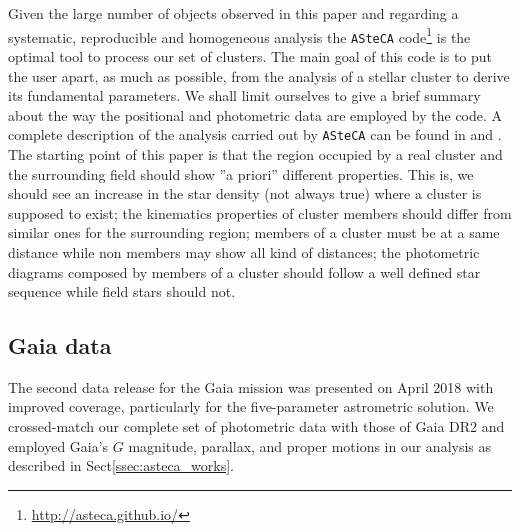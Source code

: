 \documentclass[draft]{aa}
\begin{document}
Given the large number of objects observed in this paper and regarding a
systematic, reproducible and homogeneous analysis the \texttt{ASteCA}
code\footnote{\url{http://asteca.github.io/}} is the optimal tool
to process our set of clusters. The main goal of this code is to put the user
apart, as much as possible, from the analysis of a stellar cluster to derive
its fundamental parameters. We shall limit ourselves to give a brief summary
about the way the positional and photometric data are employed by the code.
A complete description of the analysis carried out by
\texttt{ASteCA} can be found in \cite{Perren_2015} and \cite{Perren_2017}.
The starting point of this paper is that the region occupied by a real cluster
and the surrounding field should show ''a priori'' different properties. This
is, we should see an increase in the star density (not always true) where a
cluster is supposed to exist; the kinematics properties of cluster members
should differ from similar ones for the surrounding region; members of a
cluster must be at a same distance while non members may show all kind of
distances; the photometric diagrams composed by members of a cluster should
follow a well defined star sequence while field stars should not. 



\subsection{Gaia data}
\label{ssec:gaia_data}

The second data release for the Gaia mission \citep{GaiaDR2_2018} was presented
on April 2018 with improved coverage, particularly for the five-parameter
astrometric solution.
We crossed-match our complete set of photometric data with those of Gaia DR2
and employed Gaia's $G$ magnitude, parallax, and proper motions in our
analysis as described in Sect\ref{ssec:asteca_works}.
\end{document}
